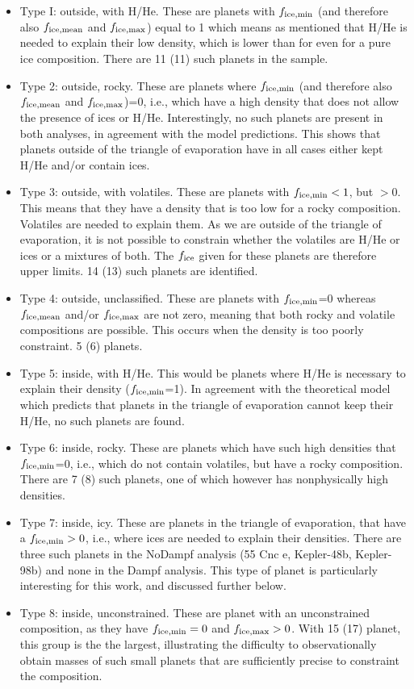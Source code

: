 \documentclass[]{emulateapj}
\begin{document}
\begin{itemize}
\item Type I: outside, with H/He. These are planets with $f_{\rm ice,min}$ (and therefore also $f_{\rm ice,mean}$ and $f_{\rm ice,max}$) equal to 1 which means as mentioned  that H/He is needed to explain their low density, which is lower than for even for a pure ice composition. There are 11 (11) such planets in the sample.
\item Type 2: outside, rocky. These are planets where $f_{\rm ice,min}$ (and therefore also $f_{\rm ice,mean}$ and $f_{\rm ice,max}$)=0, i.e., which have a high density that does not allow the presence of ices or H/He. Interestingly, no such planets are present in both analyses, in agreement with the model predictions. This shows that planets outside of the triangle of evaporation have in all cases either kept H/He and/or contain ices.
\item Type 3: outside, with volatiles. These are planets with  $f_{\rm ice,min}<1$, but $>0$. This means that they have a density that is too low for a rocky composition. Volatiles are needed to explain them. As we are outside of the triangle of evaporation, it is not possible to constrain whether the volatiles are H/He or ices or a mixtures of both. The $f_{\rm ice}$ given for these planets are therefore upper limits. 14 (13) such planets are identified.
\item Type 4: outside, unclassified. These are planets with $f_{\rm ice,min}$=0 whereas $f_{\rm ice,mean}$ and/or $f_{\rm ice,max}$ are not zero, meaning that both rocky and volatile compositions are possible. This occurs when the density is too poorly constraint. 5 (6) planets.  
\item Type 5: inside, with H/He. This would be planets where H/He is necessary to explain their density ($f_{\rm ice,min}$=1). In agreement with the theoretical model which predicts that planets in the triangle of evaporation cannot keep their H/He, no such planets are found.
\item Type 6: inside, rocky. These are planets which have such high densities that $f_{\rm ice,min}$=0, i.e., which do not contain volatiles, but have a rocky composition. There are 7 (8)  such planets, one of which however has  nonphysically high densities.
\item Type 7: inside, icy.  These are planets  in the triangle of evaporation, that have a $f_{\rm ice,min}>0$, i.e., where ices are needed to explain their densities. There are three such planets in the NoDampf analysis (55 Cnc e, Kepler-48b, Kepler-98b) and none in the Dampf analysis. This  type of planet is particularly interesting for this work, and discussed further below.
\item Type 8: inside, unconstrained. These are planet with an unconstrained composition, as they have $f_{\rm ice,min}=0$ and $f_{\rm ice,max}>0$. With 15 (17) planet, this group is the the largest, illustrating the difficulty to observationally obtain masses of such small planets that are sufficiently precise to constraint the composition.
\end{itemize}
\end{document}
